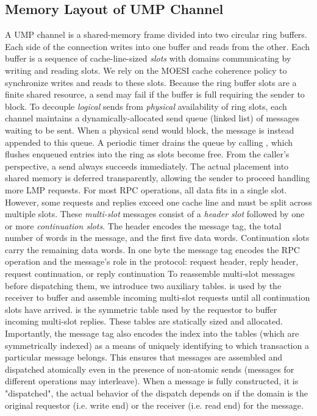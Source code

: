 \subsection{Memory Layout of UMP Channel}
A UMP channel is a shared-memory frame divided into two circular ring buffers.
Each side of the connection writes into one buffer and reads from the other.
Each buffer is a sequence of cache-line-sized \textit{slots} with domains communicating
by writing and reading slots. We rely on the MOESI cache coherence policy to synchronize
writes and reads to these slots.
 \newline
 \newline
\noindent
Because the ring buffer slots are a finite shared resource, a send may fail if
the buffer is full requiring the sender to block. To decouple \textit{logical}
sends from \textit{physical} availability of ring slots, each channel maintains a
dynamically-allocated send queue (linked list) of messages waiting to be sent.
When a physical send would block, the message is instead appended to
this queue. A periodic timer drains the queue by calling ,
which flushes enqueued entries into the ring as slots become free. From the
caller's perspective, a send always succeeds immediately. The actual placement
into shared memory is deferred transparently, allowing the sender to proceed handling
more LMP requests. \newline
\newline
\noindent
For most RPC operations, all data fits in a single slot. However, some requests
and replies exceed one cache line and must be split across multiple slots. These
\textit{multi-slot }messages consist of a \textit{header slot} followed by one or
more \textit{continuation slots}. The header encodes the message tag, the total
number of words in the message, and the first five data words. Continuation slots
carry the remaining data words. In one byte the message tag encodes the RPC operation and
the message's role in the protocol: request header, reply header, request
continuation, or reply continuation\newline
 \newline
\noindent
To reassemble multi-slot messages before dispatching them, we introduce two
auxiliary tables.  is used by the receiver to buffer and
assemble incoming multi-slot requests until all continuation slots have arrived.
 is the symmetric table used by the requestor to buffer
incoming multi-slot replies. These tables are statically sized and allocated. Importantly, the message tag also encodes
the index into the tables (which are symmetrically indexed) as a means of uniquely identifying to which transaction a
particular message belongs. This ensures that messages are assembled and dispatched
atomically even in the presence of non-atomic sends (messages for different operations may interleave).
When a message is fully constructed, it is "dispatched", the actual behavior of the dispatch depends
on if the domain is the original requestor (i.e. write end) or the receiver (i.e. read end) for the message.

